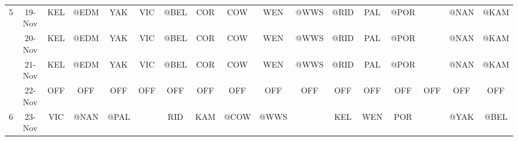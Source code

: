 \begin{table}[htbp]
\begin{tabular}{ccrrrrrrrrrrrrrrr}
    5     & 19-Nov & \multicolumn{1}{c}{KEL} & \multicolumn{1}{c}{@EDM} & \multicolumn{1}{c}{YAK} & \multicolumn{1}{c}{\cellcolor[rgb]{ 1,  .6,  .8}VIC} & \multicolumn{1}{c}{@BEL} & \multicolumn{1}{c}{COR} & \multicolumn{1}{c}{COW} & \multicolumn{1}{c}{WEN} & \multicolumn{1}{c}{@WWS} & \multicolumn{1}{c}{\cellcolor[rgb]{ .588,  .588,  .588}@RID} & \multicolumn{1}{c}{\cellcolor[rgb]{ 1,  .6,  .8}PAL} & \multicolumn{1}{c}{\cellcolor[rgb]{ .588,  .588,  .588}@POR} & \cellcolor[rgb]{ 1,  .6,  .8} & \multicolumn{1}{c}{@NAN} & \multicolumn{1}{c}{@KAM} \\
          & 20-Nov & \multicolumn{1}{c}{KEL} & \multicolumn{1}{c}{@EDM} & \multicolumn{1}{c}{YAK} & \multicolumn{1}{c}{\cellcolor[rgb]{ 1,  .6,  .8}VIC} & \multicolumn{1}{c}{@BEL} & \multicolumn{1}{c}{COR} & \multicolumn{1}{c}{COW} & \multicolumn{1}{c}{WEN} & \multicolumn{1}{c}{@WWS} & \multicolumn{1}{c}{\cellcolor[rgb]{ .588,  .588,  .588}@RID} & \multicolumn{1}{c}{\cellcolor[rgb]{ 1,  .6,  .8}PAL} & \multicolumn{1}{c}{\cellcolor[rgb]{ .588,  .588,  .588}@POR} & \cellcolor[rgb]{ 1,  .6,  .8} & \multicolumn{1}{c}{@NAN} & \multicolumn{1}{c}{@KAM} \\
          & 21-Nov & \multicolumn{1}{c}{KEL} & \multicolumn{1}{c}{@EDM} & \multicolumn{1}{c}{YAK} & \multicolumn{1}{c}{\cellcolor[rgb]{ 1,  .6,  .8}VIC} & \multicolumn{1}{c}{@BEL} & \multicolumn{1}{c}{COR} & \multicolumn{1}{c}{COW} & \multicolumn{1}{c}{WEN} & \multicolumn{1}{c}{@WWS} & \multicolumn{1}{c}{\cellcolor[rgb]{ .588,  .588,  .588}@RID} & \multicolumn{1}{c}{\cellcolor[rgb]{ 1,  .6,  .8}PAL} & \multicolumn{1}{c}{\cellcolor[rgb]{ .588,  .588,  .588}@POR} & \cellcolor[rgb]{ 1,  .6,  .8} & \multicolumn{1}{c}{@NAN} & \multicolumn{1}{c}{@KAM} \\
          & 22-Nov & \multicolumn{1}{c}{OFF} & \multicolumn{1}{c}{OFF} & \multicolumn{1}{c}{OFF} & \multicolumn{1}{c}{OFF} & \multicolumn{1}{c}{OFF} & \multicolumn{1}{c}{OFF} & \multicolumn{1}{c}{OFF} & \multicolumn{1}{c}{OFF} & \multicolumn{1}{c}{OFF} & \multicolumn{1}{c}{OFF} & \multicolumn{1}{c}{OFF} & \multicolumn{1}{c}{OFF} & \multicolumn{1}{c}{OFF} & \multicolumn{1}{c}{OFF} & \multicolumn{1}{c}{OFF} \\
    6     & 23-Nov & \multicolumn{1}{c}{VIC} & \multicolumn{1}{c}{@NAN} & \multicolumn{1}{c}{@PAL} &       & \multicolumn{1}{c}{RID} & \multicolumn{1}{c}{KAM} & \multicolumn{1}{c}{@COW} & \multicolumn{1}{c}{@WWS} &       & \multicolumn{1}{c}{KEL} & \multicolumn{1}{c}{WEN} & \multicolumn{1}{c}{POR} &       & \multicolumn{1}{c}{@YAK} & \multicolumn{1}{c}{@BEL} \\

\end{tabular}
\end{table}
